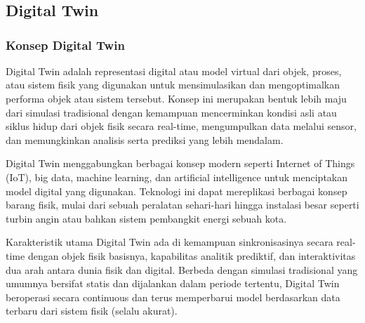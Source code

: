 \chapter{\babTiga}

\section{Digital Twin}

\subsection{Konsep Digital Twin}

Digital Twin adalah representasi digital atau model virtual dari objek, proses, atau sistem fisik yang digunakan untuk mensimulasikan dan mengoptimalkan performa objek atau sistem tersebut. Konsep ini merupakan bentuk lebih maju dari simulasi tradisional dengan kemampuan mencerminkan kondisi asli atau siklus hidup dari objek fisik secara real-time, mengumpulkan data melalui sensor, dan memungkinkan analisis serta prediksi yang lebih mendalam.


Digital Twin menggabungkan berbagai konsep modern seperti Internet of Things (IoT), big data, machine learning, dan artificial intelligence untuk menciptakan model digital yang digunakan. Teknologi ini dapat mereplikasi berbagai konsep barang fisik, mulai dari sebuah peralatan sehari-hari hingga instalasi besar seperti turbin angin atau bahkan sistem pembangkit energi sebuah kota.

Karakteristik utama Digital Twin ada di kemampuan sinkronisasinya secara real-time dengan objek fisik basisnya, kapabilitas analitik prediktif, dan interaktivitas dua arah antara dunia fisik dan digital. Berbeda dengan simulasi tradisional yang umumnya bersifat statis dan dijalankan dalam periode tertentu, Digital Twin beroperasi secara continuous dan terus memperbarui model berdasarkan data terbaru dari sistem fisik (selalu akurat).

